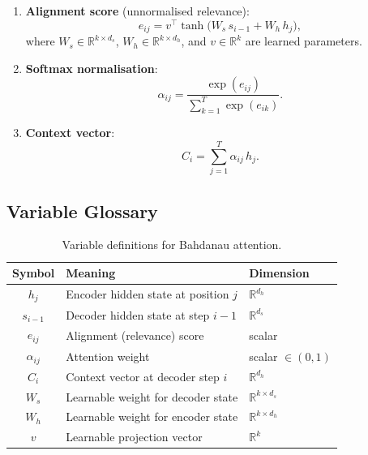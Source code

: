 \documentclass[12pt,a4paper]{article}
\begin{document}
\begin{keyinsight}[title=Bahdanau Attention --- Three Steps]
\begin{enumerate}[label=\textbf{Step \arabic*:}, leftmargin=*]
  \item \textbf{Alignment score} (unnormalised relevance):
        \begin{equation}
          e_{ij} = v^{\top} \tanh\!\bigl(W_s\, s_{i-1} + W_h\, h_j\bigr),
          \label{eq:bahdanau-score}
        \end{equation}
        where $W_s \in \mathbb{R}^{k \times d_s}$,
        $W_h \in \mathbb{R}^{k \times d_h}$, and
        $v \in \mathbb{R}^k$ are learned parameters.
  \item \textbf{Softmax normalisation}:
        \begin{equation}
          \alpha_{ij} = \frac{\exp(e_{ij})}{\displaystyle\sum_{k=1}^{T} \exp(e_{ik})}.
          \label{eq:bahdanau-alpha}
        \end{equation}
  \item \textbf{Context vector}:
        \begin{equation}
          C_i = \sum_{j=1}^{T} \alpha_{ij}\, h_j.
          \label{eq:bahdanau-ctx}
        \end{equation}
\end{enumerate}
\end{keyinsight}

\subsection{Variable Glossary}

\begin{table}[ht]
\centering
\caption{Variable definitions for Bahdanau attention.}
\label{tab:glossary}
\begin{tabular}{@{}cll@{}}
\toprule
\textbf{Symbol} & \textbf{Meaning} & \textbf{Dimension} \\
\midrule
$h_j$           & Encoder hidden state at position $j$ & $\mathbb{R}^{d_h}$ \\
$s_{i-1}$       & Decoder hidden state at step $i-1$   & $\mathbb{R}^{d_s}$ \\
$e_{ij}$        & Alignment (relevance) score           & scalar \\
$\alpha_{ij}$   & Attention weight                      & scalar $\in(0,1)$ \\
$C_i$           & Context vector at decoder step $i$   & $\mathbb{R}^{d_h}$ \\
$W_s$           & Learnable weight for decoder state   & $\mathbb{R}^{k \times d_s}$ \\
$W_h$           & Learnable weight for encoder state   & $\mathbb{R}^{k \times d_h}$ \\
$v$             & Learnable projection vector           & $\mathbb{R}^k$ \\
\bottomrule
\end{tabular}
\end{table}
\end{document}
